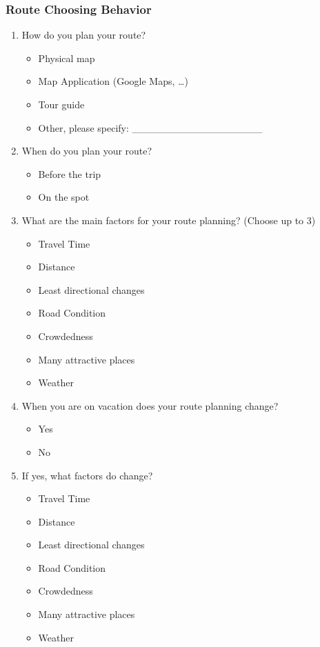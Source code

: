 \subsubsection{Route Choosing Behavior}

\begin{enumerate}
    \setcounter{enumi}{\value{surveyCounter}}
    
    \item How do you plan your route?
    \begin{itemize}
        \item Physical map
        \item Map Application (Google Maps, …)
        \item Tour guide
        \item Other, please specify: __________________
    \end{itemize}
    
    \item When do you plan your route?
    \begin{itemize}
        \item Before the trip
        \item On the spot
    \end{itemize}
    
    \item What are the main factors for your route planning? (Choose up to 3)
    \begin{itemize}
        \item Travel Time
        \item Distance
        \item Least directional changes
        \item Road Condition
        \item Crowdedness
        \item Many attractive places
        \item Weather
    \end{itemize}
    
    \item When you are on vacation does your route planning change?
    \begin{itemize}
        \item Yes
        \item No
    \end{itemize}
    
    \item If yes, what factors do change?
    \begin{itemize}
        \item Travel Time
        \item Distance
        \item Least directional changes
        \item Road Condition
        \item Crowdedness
        \item Many attractive places
        \item Weather
    \end{itemize}
    
    \setcounter{surveyCounter}{\value{enumi}}
\end{enumerate}

